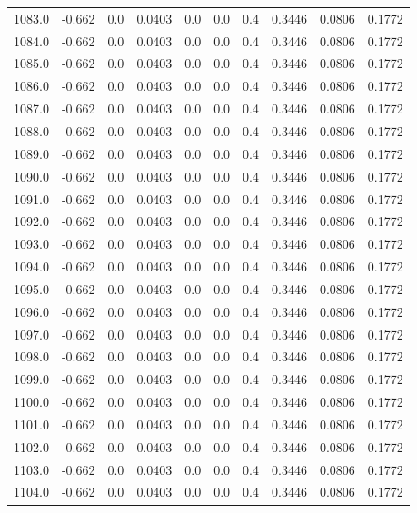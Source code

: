 \begin{longtable}{lrrrrrrrrr}
1083.0 & -0.662 & 0.0 & 0.0403 & 0.0 & 0.0 & 0.4 & 0.3446 & 0.0806 & 0.1772 \\
1084.0 & -0.662 & 0.0 & 0.0403 & 0.0 & 0.0 & 0.4 & 0.3446 & 0.0806 & 0.1772 \\
1085.0 & -0.662 & 0.0 & 0.0403 & 0.0 & 0.0 & 0.4 & 0.3446 & 0.0806 & 0.1772 \\
1086.0 & -0.662 & 0.0 & 0.0403 & 0.0 & 0.0 & 0.4 & 0.3446 & 0.0806 & 0.1772 \\
1087.0 & -0.662 & 0.0 & 0.0403 & 0.0 & 0.0 & 0.4 & 0.3446 & 0.0806 & 0.1772 \\
1088.0 & -0.662 & 0.0 & 0.0403 & 0.0 & 0.0 & 0.4 & 0.3446 & 0.0806 & 0.1772 \\
1089.0 & -0.662 & 0.0 & 0.0403 & 0.0 & 0.0 & 0.4 & 0.3446 & 0.0806 & 0.1772 \\
1090.0 & -0.662 & 0.0 & 0.0403 & 0.0 & 0.0 & 0.4 & 0.3446 & 0.0806 & 0.1772 \\
1091.0 & -0.662 & 0.0 & 0.0403 & 0.0 & 0.0 & 0.4 & 0.3446 & 0.0806 & 0.1772 \\
1092.0 & -0.662 & 0.0 & 0.0403 & 0.0 & 0.0 & 0.4 & 0.3446 & 0.0806 & 0.1772 \\
1093.0 & -0.662 & 0.0 & 0.0403 & 0.0 & 0.0 & 0.4 & 0.3446 & 0.0806 & 0.1772 \\
1094.0 & -0.662 & 0.0 & 0.0403 & 0.0 & 0.0 & 0.4 & 0.3446 & 0.0806 & 0.1772 \\
1095.0 & -0.662 & 0.0 & 0.0403 & 0.0 & 0.0 & 0.4 & 0.3446 & 0.0806 & 0.1772 \\
1096.0 & -0.662 & 0.0 & 0.0403 & 0.0 & 0.0 & 0.4 & 0.3446 & 0.0806 & 0.1772 \\
1097.0 & -0.662 & 0.0 & 0.0403 & 0.0 & 0.0 & 0.4 & 0.3446 & 0.0806 & 0.1772 \\
1098.0 & -0.662 & 0.0 & 0.0403 & 0.0 & 0.0 & 0.4 & 0.3446 & 0.0806 & 0.1772 \\
1099.0 & -0.662 & 0.0 & 0.0403 & 0.0 & 0.0 & 0.4 & 0.3446 & 0.0806 & 0.1772 \\
1100.0 & -0.662 & 0.0 & 0.0403 & 0.0 & 0.0 & 0.4 & 0.3446 & 0.0806 & 0.1772 \\
1101.0 & -0.662 & 0.0 & 0.0403 & 0.0 & 0.0 & 0.4 & 0.3446 & 0.0806 & 0.1772 \\
1102.0 & -0.662 & 0.0 & 0.0403 & 0.0 & 0.0 & 0.4 & 0.3446 & 0.0806 & 0.1772 \\
1103.0 & -0.662 & 0.0 & 0.0403 & 0.0 & 0.0 & 0.4 & 0.3446 & 0.0806 & 0.1772 \\
1104.0 & -0.662 & 0.0 & 0.0403 & 0.0 & 0.0 & 0.4 & 0.3446 & 0.0806 & 0.1772 \\

\end{longtable}
